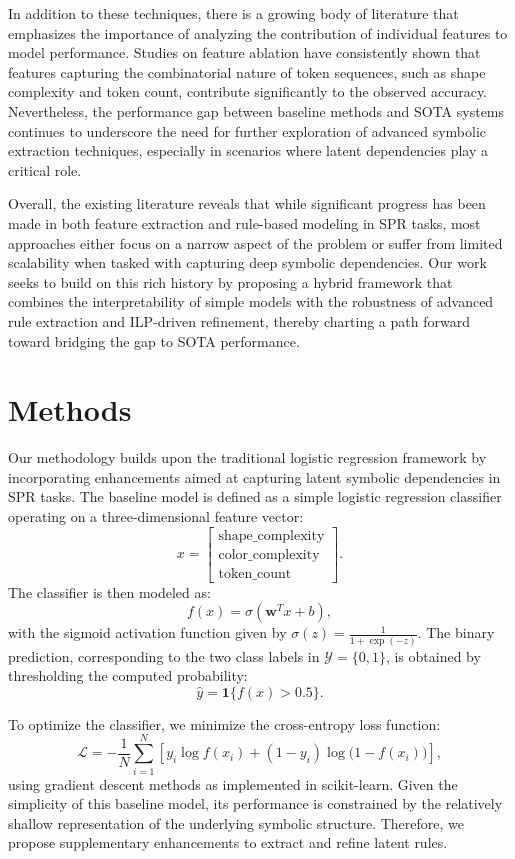 \documentclass{article}
\begin{document}
In addition to these techniques, there is a growing body of literature that emphasizes the importance of analyzing the contribution of individual features to model performance. Studies on feature ablation have consistently shown that features capturing the combinatorial nature of token sequences, such as shape complexity and token count, contribute significantly to the observed accuracy. Nevertheless, the performance gap between baseline methods and SOTA systems continues to underscore the need for further exploration of advanced symbolic extraction techniques, especially in scenarios where latent dependencies play a critical role.

Overall, the existing literature reveals that while significant progress has been made in both feature extraction and rule-based modeling in SPR tasks, most approaches either focus on a narrow aspect of the problem or suffer from limited scalability when tasked with capturing deep symbolic dependencies. Our work seeks to build on this rich history by proposing a hybrid framework that combines the interpretability of simple models with the robustness of advanced rule extraction and ILP-driven refinement, thereby charting a path forward toward bridging the gap to SOTA performance.

\section{Methods}
Our methodology builds upon the traditional logistic regression framework by incorporating enhancements aimed at capturing latent symbolic dependencies in SPR tasks. The baseline model is defined as a simple logistic regression classifier operating on a three-dimensional feature vector:
\[
x = \begin{bmatrix}
\text{shape\_complexity} \\
\text{color\_complexity} \\
\text{token\_count}
\end{bmatrix}.
\]
The classifier is then modeled as:
\[
f(x) = \sigma(\mathbf{w}^T x + b),
\]
with the sigmoid activation function given by \(\sigma(z) = \frac{1}{1+\exp(-z)}\). The binary prediction, corresponding to the two class labels in \(\mathcal{Y}=\{0,1\}\), is obtained by thresholding the computed probability:
\[
\hat{y} = \mathbf{1}\{f(x) > 0.5\}.
\]

To optimize the classifier, we minimize the cross-entropy loss function:
\[
\mathcal{L} = -\frac{1}{N}\sum_{i=1}^{N}\left[y_i \log f(x_i) + (1-y_i)\log\bigl(1-f(x_i)\bigr)\right],
\]
using gradient descent methods as implemented in scikit-learn. Given the simplicity of this baseline model, its performance is constrained by the relatively shallow representation of the underlying symbolic structure. Therefore, we propose supplementary enhancements to extract and refine latent rules.
\end{document}
